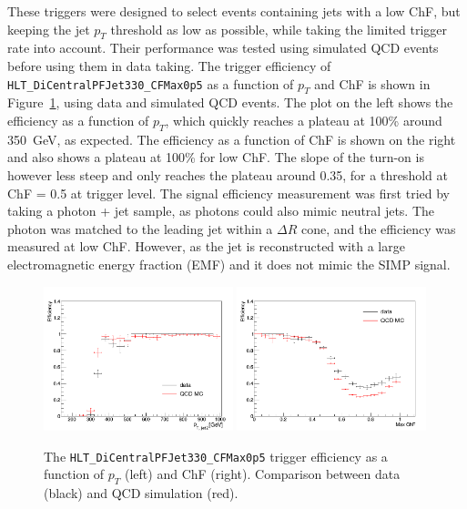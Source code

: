 These triggers were designed to select events containing jets with a low ChF, but keeping the jet $p_T$ threshold as low as possible, while taking the limited trigger rate into account. Their performance was tested using simulated \ac{QCD} events before using them in data taking. The trigger efficiency of \texttt{HLT\_DiCentralPFJet330\_CFMax0p5} as a function of $p_{T}$ and ChF is shown in Figure~\ref{fig:efficiencies_qcd_data}, using data and simulated \ac{QCD} events. The plot on the left shows the efficiency as a function of $p_T$, which quickly reaches a plateau at 100\% around \SI{350}{GeV}, as expected. The efficiency as a function of ChF is shown on the right and also shows a plateau at 100\% for low ChF. The slope of the turn-on is however less steep and only reaches the plateau around 0.35, for a threshold at ChF = 0.5 at trigger level. The signal efficiency measurement was first tried by taking a photon + jet sample, as photons could also mimic neutral jets. The photon was matched to the leading jet within a $\Delta R$ cone, and the efficiency was measured at low ChF. However, as the jet is reconstructed with a large electromagnetic energy fraction (EMF) and it does not mimic the \ac{SIMP} signal. 

\begin{figure}[ht]
  \centering
  \includegraphics[width=0.49\textwidth]{figures/trigger/pt_eff_05_DataMC.png}\hfill%
  \includegraphics[width=0.49\textwidth]{figures/trigger/chf_eff_05_DataMC.png}
  \caption{The \texttt{HLT\_DiCentralPFJet330\_CFMax0p5} trigger efficiency as a function of $p_{T}$ (left) and ChF (right). Comparison between data (black) and \ac{QCD} simulation (red). }
  \label{fig:efficiencies_qcd_data}
\end{figure}

